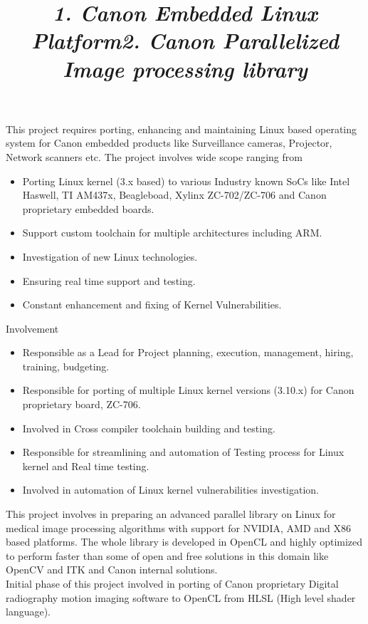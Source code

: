 \begin{resume}
\title{\em 1. Canon Embedded Linux Platform}
\employer {}

\begin {position}
This project requires porting, enhancing and maintaining Linux based operating system for Canon embedded products like Surveillance cameras, Projector, Network scanners etc. The project involves wide scope ranging from 
\renewcommand{\labelitemi}{$\ast$}
\begin{itemize}
\item Porting Linux kernel (3.x based) to various Industry known SoCs like Intel Haswell, TI AM437x, Beagleboad, Xylinx ZC-702/ZC-706 and Canon proprietary embedded boards. 
\item Support custom toolchain for multiple architectures including ARM. 
\item Investigation of new Linux technologies.
\item Ensuring real time support and testing. 
\item Constant enhancement and fixing of Kernel Vulnerabilities. 
\end{itemize}

Involvement
\renewcommand{\labelitemi}{$\bullet$}
\begin{itemize}
\item Responsible as a Lead for Project planning, execution, management, hiring, training, budgeting.
\item Responsible for porting of multiple Linux kernel versions (3.10.x) for Canon proprietary board, ZC-706. 
\item Involved in Cross compiler toolchain building and testing.
\item Responsible for streamlining and automation of Testing process for Linux kernel and Real time testing. 
\item Involved in automation of Linux kernel vulnerabilities investigation.
\end{itemize}
\end{position}
\hrulefill

\title{\em 2. Canon Parallelized Image processing library }
\employer {}

\begin {position}
This project involves in preparing an advanced parallel library on Linux for medical image processing algorithms with support for NVIDIA, AMD and X86 based platforms.  The whole library is developed in OpenCL and highly optimized to perform faster than some of open and free solutions in this domain like OpenCV and ITK and Canon internal solutions. \\
Initial phase of this project involved in porting of Canon proprietary Digital radiography motion imaging software to OpenCL from HLSL (High level shader language). \\


\end{position}
\end{resume}
